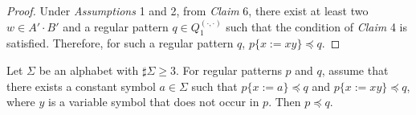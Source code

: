 \begin{proof}
\smallskip

Under \textit{Assumptions} 1 and 2, from \textit{Claim} 6, there exist at least two $w\in A'\cdot B'$ and a regular pattern $q \in Q_{1}^{(\cdot,\cdot)}$ such that the condition of \textit{Claim} 4 is satisfied. 
Therefore, for such a regular pattern $q$, $p \{x := xy\} \preceq q$.
\end{proof}

\begin{lem}\label{Sato1:Lemma15}
{\color{black} Let $\Sigma$ be an alphabet with $\sharp \Sigma \ge 3$}.
{\color{black} For regular patterns $p$ and $q$,
assume that there exists a constant symbol $a \in \Sigma$ such that $p \{ x := a \} \preceq q$ and $p \{ x := xy \} \preceq q$, where $y$ is a variable symbol that does not occur in {\color{black}$p$}.
Then $p \preceq q$.}
\end{lem}

